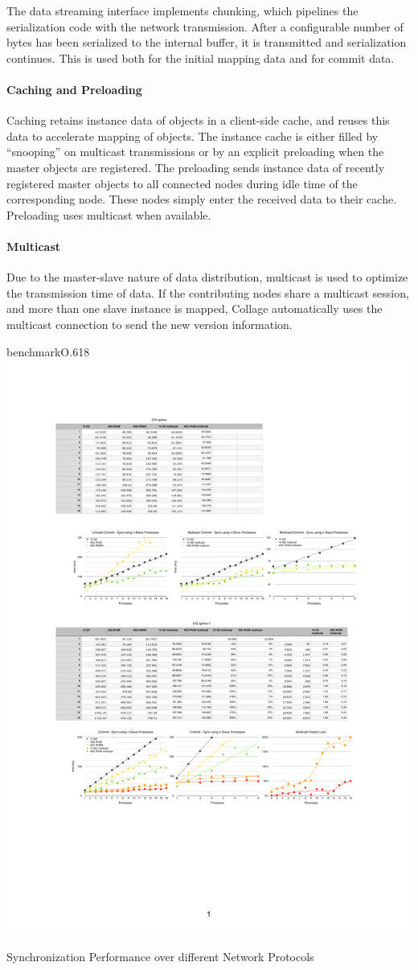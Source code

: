 The data streaming interface implements chunking, which pipelines the
serialization code with the network transmission. After a configurable number of
bytes has been serialized to the internal buffer, it is transmitted and
serialization continues. This is used both for the initial mapping data and for
commit data.

\paragraph{Caching and Preloading}

Caching retains instance data of objects in a client-side cache, and reuses
this data to accelerate mapping of objects. The instance cache is either filled
by ``snooping'' on multicast transmissions or by an explicit preloading when
the master objects are registered. The preloading sends instance data of
recently registered master objects to all connected nodes during idle time of
the corresponding node. These nodes simply enter the received data to their
cache. Preloading uses multicast when available.

\paragraph{Multicast}

Due to the master-slave nature of data distribution, multicast is used to
optimize the transmission time of data. If the contributing nodes share a
multicast session, and more than one slave instance is mapped, \textsf{Collage}
automatically uses the multicast connection to send the new version
information.

\begin{wrapfloat}{benchmark}{O}{.618\textwidth}
  \includegraphics[width=.618\textwidth]{results/network}
  {\caption{\label{rNetwork}Synchronization Performance over different Network Protocols}}
\end{wrapfloat}

